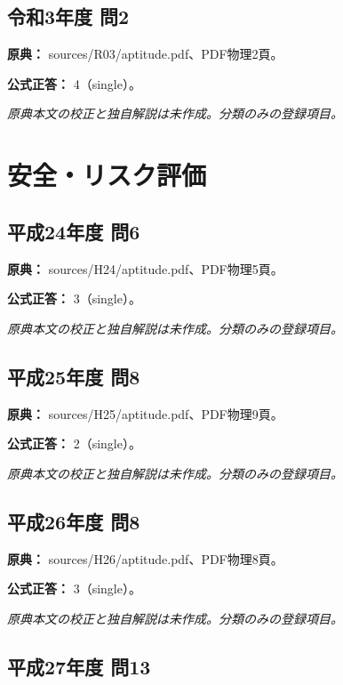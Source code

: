 \subsection{令和3年度 問2}
\label{q:r03-reg-apt-02}

\noindent\textbf{原典：} sources/R03/aptitude.pdf、PDF物理2頁。

\textbf{公式正答：} 4（single）。

\par\textit{原典本文の校正と独自解説は未作成。分類のみの登録項目。}

\section{安全・リスク評価}

\subsection{平成24年度 問6}
\label{q:h24-reg-apt-06}

\noindent\textbf{原典：} sources/H24/aptitude.pdf、PDF物理5頁。

\textbf{公式正答：} 3（single）。

\par\textit{原典本文の校正と独自解説は未作成。分類のみの登録項目。}

\subsection{平成25年度 問8}
\label{q:h25-reg-apt-08}

\noindent\textbf{原典：} sources/H25/aptitude.pdf、PDF物理9頁。

\textbf{公式正答：} 2（single）。

\par\textit{原典本文の校正と独自解説は未作成。分類のみの登録項目。}

\subsection{平成26年度 問8}
\label{q:h26-reg-apt-08}

\noindent\textbf{原典：} sources/H26/aptitude.pdf、PDF物理8頁。

\textbf{公式正答：} 3（single）。

\par\textit{原典本文の校正と独自解説は未作成。分類のみの登録項目。}

\subsection{平成27年度 問13}
\label{q:h27-reg-apt-13}


